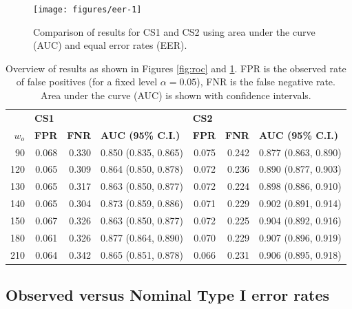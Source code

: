 \documentclass[12pt]{article}
\begin{document}
\begin{figure}

{\centering \texttt{[image: figures/eer-1]} 

}

\caption{Comparison of results for CS1 and CS2 using area under the curve (AUC) and equal error rates (EER). }\label{fig:eer}
\end{figure}

\begin{table}[hbtp]
\centering
\begin{adjustbox}{max width=\textwidth}
\begin{tabular}{rrrlrrl}
  \hline
  & \multicolumn{3}{l}{\bf CS1} & \multicolumn{3}{l}{\bf CS2} \\
$w_o$ & \bf FPR & \bf FNR & \bf AUC (95\% C.I.) & \bf FPR & \bf FNR & \bf AUC (95\% C.I.) \\ 
  \hline
90 & 0.068 & 0.330 & 0.850 (0.835, 0.865) & 0.075 & 0.242 & 0.877 (0.863, 0.890) \\ 
  120 & 0.065 & 0.309 & 0.864 (0.850, 0.878) & 0.072 & 0.236 & 0.890 (0.877, 0.903) \\ 
  130 & 0.065 & 0.317 & 0.863 (0.850, 0.877) & 0.072 & 0.224 & 0.898 (0.886, 0.910) \\ 
  140 & 0.065 & 0.304 & 0.873 (0.859, 0.886) & 0.071 & 0.229 & 0.902 (0.891, 0.914) \\ 
  150 & 0.067 & 0.326 & 0.863 (0.850, 0.877) & 0.072 & 0.225 & 0.904 (0.892, 0.916) \\ 
  180 & 0.061 & 0.326 & 0.877 (0.864, 0.890) & 0.070 & 0.229 & 0.907 (0.896, 0.919) \\ 
  210 & 0.064 & 0.342 & 0.865 (0.851, 0.878) & 0.066 & 0.231 & 0.906 (0.895, 0.918) \\ 
   \hline
\end{tabular}
\end{adjustbox}
\caption{\label{tab:aucs} Overview of results as shown in Figures \ref{fig:roc} and \ref{fig:eer}. FPR is the observed rate of false positives (for a fixed level $\alpha = 0.05$), FNR is the false negative rate. Area under the curve (AUC) is shown with confidence intervals. }
\end{table}

\hypertarget{observed-versus-nominal-type-i-error-rates}{%
\subsection{Observed versus Nominal Type I error
rates}\label{observed-versus-nominal-type-i-error-rates}}
\end{document}

